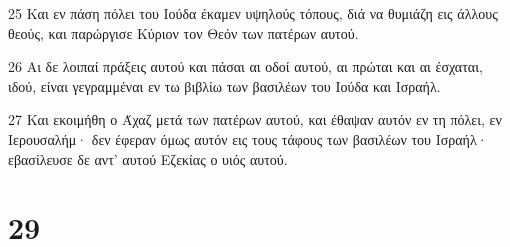 \par 25 Και εν πάση πόλει του Ιούδα έκαμεν υψηλούς τόπους, διά να θυμιάζη εις άλλους θεούς, και παρώργισε Κύριον τον Θεόν των πατέρων αυτού.
\par 26 Αι δε λοιπαί πράξεις αυτού και πάσαι αι οδοί αυτού, αι πρώται και αι έσχαται, ιδού, είναι γεγραμμέναι εν τω βιβλίω των βασιλέων του Ιούδα και Ισραήλ.
\par 27 Και εκοιμήθη ο Άχαζ μετά των πατέρων αυτού, και έθαψαν αυτόν εν τη πόλει, εν Ιερουσαλήμ· δεν έφεραν όμως αυτόν εις τους τάφους των βασιλέων του Ισραήλ· εβασίλευσε δε αντ' αυτού Εζεκίας ο υιός αυτού.

\chapter{29}


